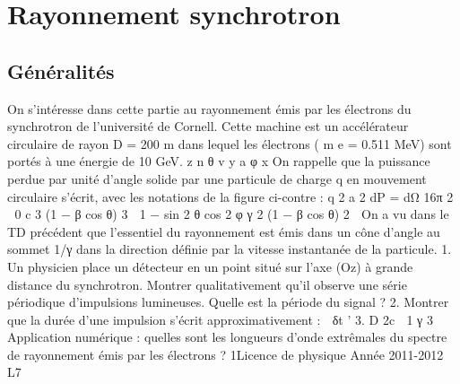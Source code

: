 
\section{Rayonnement synchrotron}%
\subsection{Généralités}%
On s'intéresse dans cette partie au rayonnement émis par les électrons du synchrotron de
l'université de Cornell. Cette machine est un accélérateur circulaire de rayon D = 200 m dans
lequel les électrons ( m e = 0.511 MeV) sont portés à une énergie de 10 GeV.
z
n
θ
v
y
a
φ
x
On rappelle que la puissance perdue par unité d'angle solide par une particule de charge q en
mouvement circulaire s'écrit, avec les notations de la figure ci-contre :
q 2
a 2
dP
=
dΩ
16π 2  0 c 3 (1 − β cos θ) 3

1 −
sin 2 θ cos 2 φ
γ 2 (1 − β cos θ) 2

On a vu dans le TD précédent que l'essentiel du rayonnement est émis dans un cône d'angle
au sommet 1/γ dans la direction définie par la vitesse instantanée de la particule.
1. Un physicien place un détecteur en un point situé sur l'axe (Oz) à grande distance du
synchrotron. Montrer qualitativement qu'il observe une série périodique d'impulsions lumineuses. Quelle est la période du signal ?
2. Montrer que la durée d'une impulsion s'écrit approximativement :

δt '
3.
D
2c

1
γ 3
Application numérique : quelles sont les longueurs d'onde extrêmales du spectre de rayonnement émis par les électrons ?
1Licence de physique
Année 2011-2012
L7
